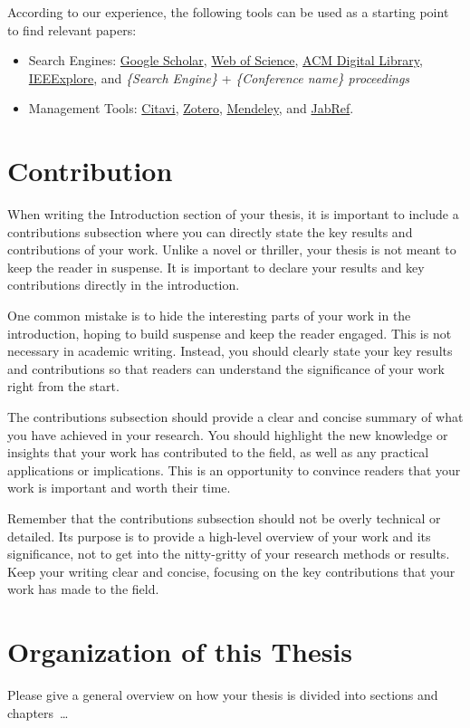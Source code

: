 According to our experience, the following tools can be used as a starting point to find relevant papers:
\begin{itemize}
    \item Search Engines: \href{https://scholar.google.com}{Google Scholar}, \href{https://www.webofknowledge.com/}{Web of Science}, \href{https://dl.acm.org/}{ACM Digital Library}, \href{https://ieeexplore.ieee.org/Xplore/home.jsp}{IEEExplore}, and \emph{\{Search Engine\}} + \emph{\{Conference name\} proceedings}
    \item Management Tools: \href{https://www.it-services.ruhr-uni-bochum.de/services/software/citavi.html.de}{Citavi}, \href{https://www.zotero.org/}{Zotero}, \href{https://www.mendeley.com/}{Mendeley}, and \href{https://www.jabref.org/}{JabRef}.
\end{itemize}


\section{Contribution}

When writing the Introduction section of your thesis, it is important to include a contributions subsection where you can directly state the key results and contributions of your work. Unlike a novel or thriller, your thesis is not meant to keep the reader in suspense. It is important to declare your results and key contributions directly in the introduction.

One common mistake is to hide the interesting parts of your work in the introduction, hoping to build suspense and keep the reader engaged. This is not necessary in academic writing. Instead, you should clearly state your key results and contributions so that readers can understand the significance of your work right from the start.

The contributions subsection should provide a clear and concise summary of what you have achieved in your research. You should highlight the new knowledge or insights that your work has contributed to the field, as well as any practical applications or implications. This is an opportunity to convince readers that your work is important and worth their time.

Remember that the contributions subsection should not be overly technical or detailed. Its purpose is to provide a high-level overview of your work and its significance, not to get into the nitty-gritty of your research methods or results. Keep your writing clear and concise, focusing on the key contributions that your work has made to the field.

\section{Organization of this Thesis}
Please give a general overview on how your thesis is divided into sections and chapters~\dots

